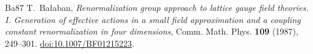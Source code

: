 \documentclass[11pt,letterpaper,reqno]{amsart}
\numberwithin{equation}{section}
\theoremstyle{definition}
\theoremstyle{remark}
\begin{document}
\begin{thebibliography}{Ba87}
\small
{}
T.~Ba{\l}aban, \emph{Renormalization group approach to lattice gauge
field theories. I. Generation of effective actions in a small field
approximation and a coupling constant renormalization in four
dimensions}, Comm. Math. Phys. \textbf{109} (1987), 249--301.
\href{https://doi.org/10.1007/BF01215223}{doi:10.1007/BF01215223}.
\end{thebibliography}
\end{document}
